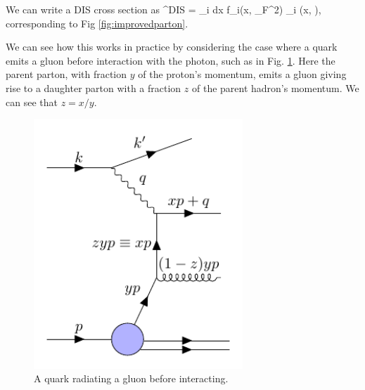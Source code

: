 We can write a DIS cross section as
\be
\label{eqn:disfact}
\sigma^{DIS} = \sum_i \int dx f_i(x, \mu_F^2) \hat{\sigma}_i \bigg(x,  \bigg),
\ee
corresponding to Fig \ref{fig:improvedparton}. 

We can see how this works in practice by considering the case where a quark emits a gluon before interaction with the photon, such as in Fig. \ref{fig:scalingviolation}. Here the parent parton, with fraction $y$ of the proton's momentum, emits a gluon giving rise to a daughter parton with a fraction $z$ of the parent hadron's momentum. We can see that $z = x/y$.

\begin{figure}[H]
\centering
\includegraphics[width=0.7\textwidth]{../diagrams/scalingviolation.pdf}
\caption{\label{fig:scalingviolation} A quark radiating a gluon before interacting.}
\end{figure}

